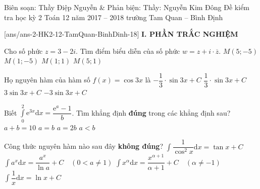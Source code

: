 
	\begin{name}
{Biên soạn: Thầy Điệp Nguyễn \& Phản biện: Thầy: Nguyễn Kim Đông}
		{Đề kiểm tra học kỳ 2 Toán 12 năm 2017 – 2018 trường Tam Quan – Bình Định}
	\end{name}
	\setcounter{ex}{0}\setcounter{bt}{0}
	[ans/ans-2-HK2-12-TamQuan-BinhDinh-18]
\noindent\textbf{I. PHẦN TRẮC NGHIỆM}
\begin{ex}%
	Cho số phức $z=3-2i.$ Tìm điểm biểu diễn của số phức $ w=z+i\cdot \overline{z}$.
	\choice
	{$M\left(5;-5\right)$}
	{$M\left(1;-5\right)$}
	{\True $M\left(1;1\right)$}
	{$M\left(5;1\right)$}
\end{ex}
\begin{ex}%
	Họ nguyên hàm của hàm số $f(x)= \cos3x$ là
	\choice
	{$-\dfrac{1}{3}\cdot\sin 3x+C$}
	{\True $\dfrac{1}{3}\cdot\sin 3x+C$}
	{$3\sin 3x+C$}
	{$-3\sin 3x+C$}
\end{ex}
\begin{ex}%
	Biết $\displaystyle \int \limits _0 ^2 \mathrm{e}^{3x}\mathrm{d}x =\dfrac{\mathrm{e}^a-1}{b}$. Tìm khẳng định \textbf{đúng} trong các khẳng định sau?
	\choice
	{$a+b=10$}
	{$a=b$}
	{\True $a=2b$}
	{$a<b$}
\end{ex}
\begin{ex}%
	Công thức nguyên hàm nào sau đây \textbf{không đúng}?
	\choice
	{$\displaystyle \int \dfrac{1}{\cos^2x}\mathrm{d}x=\tan x+C$}
	{$\displaystyle \int a^x \mathrm{d}x=\dfrac{a^x}{\ln a}+C\quad (0<a\ne 1)$}
	{$\displaystyle \int x^{\alpha}\mathrm{d}x=\dfrac{x^{\alpha+1}}{\alpha+1}+C\quad (\alpha \ne-1)$}
	{\True $\displaystyle \int\dfrac{1}{x}\mathrm{d}x=\ln x+C$}
\end{ex}
